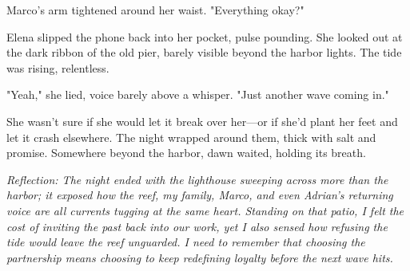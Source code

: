 Marco's arm tightened around her waist. "Everything okay?"

Elena slipped the phone back into her pocket, pulse pounding. She looked out at the dark ribbon of the old pier, barely visible beyond the harbor lights. The tide was rising, relentless.

"Yeah," she lied, voice barely above a whisper. "Just another wave coming in."

She wasn't sure if she would let it break over her—or if she'd plant her feet and let it crash elsewhere. The night wrapped around them, thick with salt and promise. Somewhere beyond the harbor, dawn waited, holding its breath.

\noindent\textit{Reflection: The night ended with the lighthouse sweeping across more than the harbor; it exposed how the reef, my family, Marco, and even Adrian's returning voice are all currents tugging at the same heart. Standing on that patio, I felt the cost of inviting the past back into our work, yet I also sensed how refusing the tide would leave the reef unguarded. I need to remember that choosing the partnership means choosing to keep redefining loyalty before the next wave hits.}
